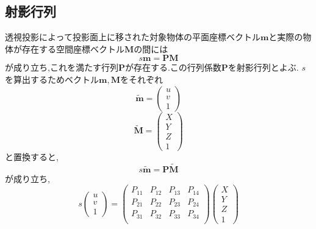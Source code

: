 \documentclass[11pt,a4j]{jsarticle}
\begin{document}
    \subsection{射影行列}
    透視投影によって投影面上に移された対象物体の平面座標ベクトル$\bm{m}$と実際の物体が存在する空間座標ベクトル$\bm{M}$の間には
    \begin{equation}
        s\bm{m} = \bm{P}\bm{M}
    \end{equation}
    が成り立ち,これを満たす行列$\bm{P}$が存在する.この行列係数$\bm{P}$を射影行列とよぶ.
    $s$を算出するためベクトル$\bm{m},\bm{M}$をそれぞれ
    \begin{equation}
        \tilde{\bm{m}} = \left(
        \begin{array}{c}
            u \\
            v \\
            1
        \end{array}
        \right)
    \end{equation}
    \begin{equation}
        \tilde{\bm{M}} = \left(
        \begin{array}{c}
            X \\
            Y \\
            Z \\
            1
        \end{array}
        \right)
    \end{equation}
    と置換すると,
    \begin{equation}
        s\tilde{\bm{m}} =\bm{P}\tilde{\bm{M}}
    \end{equation}
    が成り立ち,
    \begin{equation}
        s\left(
        \begin{array}{c}
            u \\
            v \\
            1
        \end{array}
        \right) =
        \left(
    \begin{array}{cccc}
      P_{11} & P_{12} & P_{13} & P_{14}\\
      P_{21} & P_{22} & P_{23} & P_{24} \\
      P_{31} & P_{32} & P_{33} & P_{34} \\
    \end{array}
        \right)
        \left(
        \begin{array}{c}
            X \\
            Y \\
            Z \\
            1
        \end{array}
        \right)
        \label{eq:projection_matrix}
    \end{equation}
\end{document}

